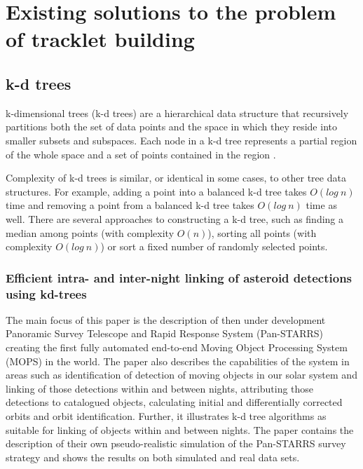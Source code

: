 \chapter{Existing solutions to the problem of tracklet building}\label{chap:existing_solutions}

\section{k-d trees}\label{sec:kd_trees}
	
	k-dimensional trees (k-d trees) are a hierarchical data structure that recursively partitions both the set of data points and the space in which they reside into smaller subsets and subspaces. Each node in a k-d tree represents a partial region of the whole space and a set of points contained in the region \citep{}.
	
	Complexity of k-d trees is similar, or identical in some cases, to other tree data structures. For example, adding a point into a balanced k-d tree takes $O(log\ n)$ time and removing a point from a balanced k-d tree takes $O(log\ n)$ time as well. There are several approaches to constructing a k-d tree, such as finding a median among points (with complexity $O(n)$), sorting all points (with complexity $O(log\ n)$) or sort a fixed number of randomly selected points.

\subsection{Efficient intra- and inter-night linking of asteroid detections using kd-trees}\label{subsec:intra_inter}

	The main focus of this paper is the description of then under development Panoramic Survey Telescope and Rapid Response System (Pan-STARRS) creating the first fully automated end-to-end Moving Object Processing System (MOPS) in the world. The paper also describes the capabilities of the system in areas such as identification of detection of moving objects in our solar system and linking of those detections within and between nights, attributing those detections to catalogued objects, calculating initial and differentially corrected orbits and orbit identification. Further, it illustrates k-d tree algorithms as suitable for linking of objects within and between nights. The paper contains the description of their own pseudo-realistic simulation of the Pan-STARRS survey strategy and shows the results on both simulated and real data sets.
	
